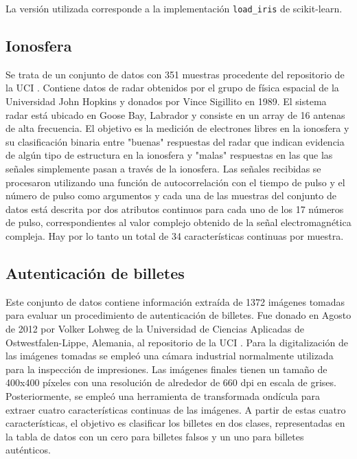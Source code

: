 La versión utilizada corresponde a la implementación \texttt{load\_iris} de scikit-learn.

\subsection{Ionosfera}

Se trata de un conjunto de datos con 351 muestras procedente del repositorio de la UCI \cite{ionosphere-dataset}. Contiene datos de radar obtenidos por el grupo de física espacial de la Universidad John Hopkins y donados por Vince Sigillito en 1989. El sistema radar está ubicado en Goose Bay, Labrador y consiste en un array de 16 antenas de alta frecuencia. El objetivo es la medición de electrones libres en la ionosfera y su clasificación binaria entre "buenas" respuestas del radar que indican evidencia de algún tipo de estructura en la ionosfera y "malas" respuestas en las que las señales simplemente pasan a través de la ionosfera. Las señales recibidas se procesaron utilizando una función de autocorrelación con el tiempo de pulso y el número de pulso como argumentos y cada una de las muestras del conjunto de datos está descrita por dos atributos continuos para cada uno de los 17 números de pulso, correspondientes al valor complejo obtenido de la señal electromagnética compleja. Hay por lo tanto un total de 34 características continuas por muestra.

\subsection{Autenticación de billetes}

Este conjunto de datos contiene información extraída de 1372 imágenes tomadas para evaluar un procedimiento de autenticación de billetes. Fue donado en Agosto de 2012 por Volker Lohweg de la Universidad de Ciencias Aplicadas de Ostwestfalen-Lippe, Alemania, al repositorio de la UCI \cite{banknote-dataset}. Para la digitalización de las imágenes tomadas se empleó una cámara industrial normalmente utilizada para la inspección de impresiones. Las imágenes finales tienen un tamaño de 400x400 píxeles con una resolución de alrededor de 660 dpi en escala de grises. Posteriormente, se empleó una herramienta de transformada ondícula para extraer cuatro características continuas de las imágenes. A partir de estas cuatro características, el objetivo es clasificar los billetes en dos clases, representadas en la tabla de datos con un cero para billetes falsos y un uno para billetes auténticos.


